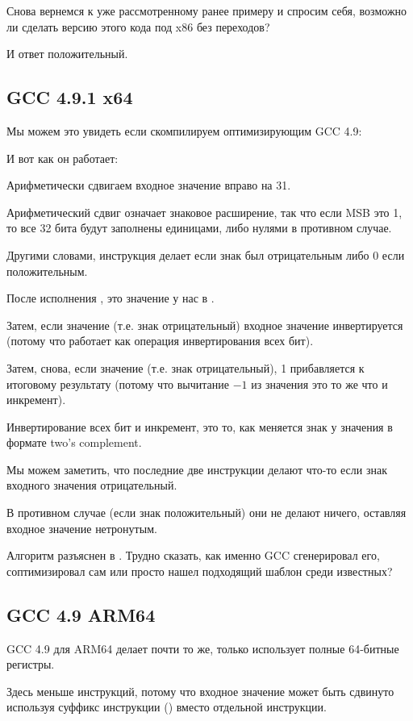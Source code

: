 \label{chap:branchless_abs}

Снова вернемся к уже рассмотренному ранее примеру  и спросим себя, возможно ли
сделать версию этого кода под x86 без переходов?



И ответ положительный.

\subsection{\Optimizing GCC 4.9.1 x64}

Мы можем это увидеть если скомпилируем оптимизирующим GCC 4.9:



И вот как он работает:

Арифметически сдвигаем входное значение вправо на 31.

Арифметический сдвиг означает знаковое расширение, так что если \ac{MSB} это 1, то все 32 бита будут
заполнены единицами, либо нулями в противном случае.

Другими словами, инструкция  делает  если знак был отрицательным либо 0 если
положительным.

После исполнения , это значение у нас в \EDX.

Затем, если значение  (т.е. знак отрицательный) входное значение инвертируется
(потому что  работает как операция инвертирования всех бит).

Затем, снова, если значение  (т.е. знак отрицательный), 1 прибавляется к итоговому результату
(потому что вычитание $-1$ из значения это то же что и инкремент).

Инвертирование всех бит и инкремент, это то, как меняется знак у значения в формате two's complement.

Мы можем заметить, что последние две инструкции делают что-то если знак входного значения отрицательный.

В противном случае (если знак положительный) они не делают ничего, оставляя входное значение нетронутым.

Алгоритм разъяснен в .
Трудно сказать, как именно GCC сгенерировал его, соптимизировал сам или просто нашел подходящий шаблон среди известных?%

\subsection{\Optimizing GCC 4.9 ARM64}

GCC 4.9 для ARM64 делает почти то же, только использует полные 64-битные регистры.

Здесь меньше инструкций, потому что входное значение может быть сдвинуто используя суффикс инструкции ()
вместо отдельной инструкции.



